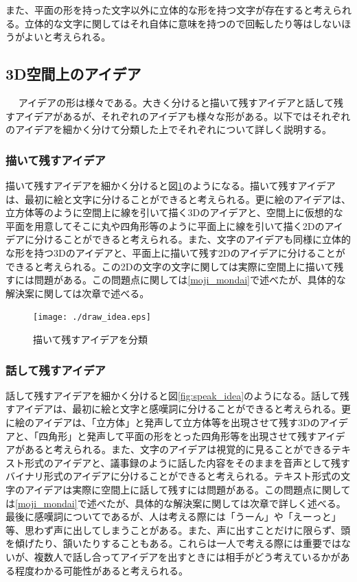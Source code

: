 \documentclass[11pt,a4j, titlepage]{jarticle} %
\begin{document}
また、平面の形を持った文字以外に立体的な形を持つ文字が存在すると考えられる。立体的な文字に関してはそれ自体に意味を持つので回転したり等はしないほうがよいと考えられる。

\subsection{3D空間上のアイデア}　\label{idea_katachi}
アイデアの形は様々である。大きく分けると描いて残すアイデアと話して残すアイデアがあるが、それぞれのアイデアも様々な形がある。以下ではそれぞれのアイデアを細かく分けて分類した上でそれぞれについて詳しく説明する。

\subsubsection{描いて残すアイデア} \label{draw_idea}
描いて残すアイデアを細かく分けると図\ref{fig:draw_idea}のようになる。描いて残すアイデアは、最初に絵と文字に分けることができると考えられる。更に絵のアイデアは、立方体等のように空間上に線を引いて描く3Dのアイデアと、空間上に仮想的な平面を用意してそこに丸や四角形等のように平面上に線を引いて描く2Dのアイデアに分けることができると考えられる。また、文字のアイデアも同様に立体的な形を持つ3Dのアイデアと、平面上に描いて残す2Dのアイデアに分けることができると考えられる。この2Dの文字の文字に関しては実際に空間上に描いて残すには問題がある。この問題点に関しては\ref{moji_mondai}で述べたが、具体的な解決案に関しては次章で述べる。

\begin{figure}[H]
  \begin{center}
    \texttt{[image: ./draw\_idea.eps]}
    \caption{描いて残すアイデアを分類}
    \label{fig:draw_idea}
  \end{center}
\end{figure}

\subsubsection{話して残すアイデア} \label{speak_idea}
話して残すアイデアを細かく分けると図\ref{fig:speak_idea}のようになる。話して残すアイデアは、最初に絵と文字と感嘆詞に分けることができると考えられる。更に絵のアイデアは、「立方体」と発声して立方体等を出現させて残す3Dのアイデアと、「四角形」と発声して平面の形をとった四角形等を出現させて残すアイデアがあると考えられる。また、文字のアイデアは視覚的に見ることができるテキスト形式のアイデアと、議事録のように話した内容をそのままを音声として残すバイナリ形式のアイデアに分けることができると考えられる。テキスト形式の文字のアイデアは実際に空間上に話して残すには問題がある。この問題点に関しては\ref{moji_mondai}で述べたが、具体的な解決案に関しては次章で詳しく述べる。最後に感嘆詞についてであるが、人は考える際には「うーん」や「えーっと」等、思わず声に出してしまうことがある。また、声に出すことだけに限らず、頭を傾げたり、頷いたりすることもある。これらは一人で考える際には重要ではないが、複数人で話し合ってアイデアを出すときには相手がどう考えているかがある程度わかる可能性があると考えられる。
\end{document}
